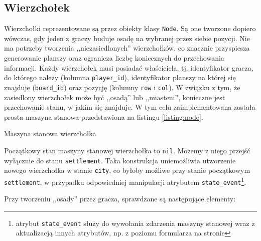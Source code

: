 \documentclass[11pt,twoside]{report}
\begin{document}
\subsection{Wierzchołek}

Wierzchołki reprezentowane są przez obiekty klasy \texttt{Node}. Są
one tworzone dopiero wówczas, gdy jeden z graczy buduje osadę na
wybranej przez siebie pozycji. Nie ma potrzeby tworzenia
,,niezasiedlonych'' wierzchołków, co znacznie przyspiesza generowanie
planszy oraz ogranicza liczbę koniecznych do przechowania
informacji. Każdy wierzchołek musi posiadać właściciela,
tj. identyfikator gracza, do którego należy (kolumna
\texttt{player\_id}), identyfikator planszy na której się znajduje
(\texttt{board\_id}) oraz pozycję (kolumny \texttt{row} i
\texttt{col}).  W związku z tym, że zasiedlony wierzchołek może być
,,osadą'' lub ,,miastem'', konieczne jest przechowanie stanu, w jakim
się znajduje. W tym celu zaimplementowana została prosta maszyna
stanowa przedstawiona na listingu \ref{listing:node}.


\begin{listing}
  
  \caption{Maszyna stanowa wierzchołka}
  \label{listing:node}
\end{listing}

Początkowy stan maszyny stanowej wierzchołka to \texttt{nil}. Możemy z
niego przejść wyłącznie do stanu \texttt{settlement}. Taka konstrukcja
uniemożliwia utworzenie nowego wierzchołka w stanie \texttt{city}, co
byłoby możliwe przy stanie początkowym \texttt{settlement}, w
przypadku odpowiedniej manipulacji atrybutem
\texttt{state\_event}\footnote{atrybut \texttt{state\_event} służy do
  wywołania zdarzenia maszyny stanowej wraz z aktualizacją innych
  atrybutów, np. z poziomu formularza na stronie}.

Przy tworzeniu ,,osady'' przez gracza, sprawdzane są następujące
elementy:
\end{document}
